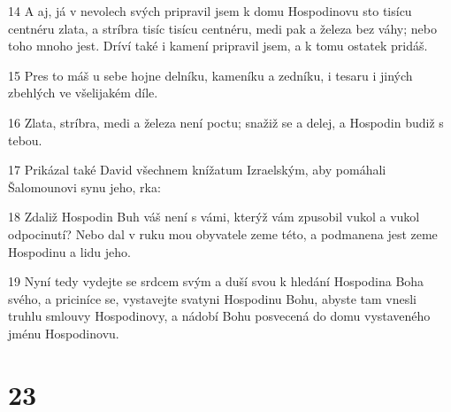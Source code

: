 \par 14 A aj, já v nevolech svých pripravil jsem k domu Hospodinovu sto tisícu centnéru zlata, a stríbra tisíc tisícu centnéru, medi pak a železa bez váhy; nebo toho mnoho jest. Dríví také i kamení pripravil jsem, a k tomu ostatek pridáš.
\par 15 Pres to máš u sebe hojne delníku, kameníku a zedníku, i tesaru i jiných zbehlých ve všelijakém díle.
\par 16 Zlata, stríbra, medi a železa není poctu; snažiž se a delej, a Hospodin budiž s tebou.
\par 17 Prikázal také David všechnem knížatum Izraelským, aby pomáhali Šalomounovi synu jeho, rka:
\par 18 Zdaliž Hospodin Buh váš není s vámi, kterýž vám zpusobil vukol a vukol odpocinutí? Nebo dal v ruku mou obyvatele zeme této, a podmanena jest zeme Hospodinu a lidu jeho.
\par 19 Nyní tedy vydejte se srdcem svým a duší svou k hledání Hospodina Boha svého, a priciníce se, vystavejte svatyni Hospodinu Bohu, abyste tam vnesli truhlu smlouvy Hospodinovy, a nádobí Bohu posvecená do domu vystaveného jménu Hospodinovu.

\chapter{23}

